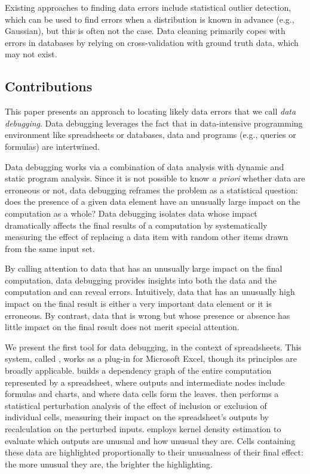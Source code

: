 
Existing approaches to finding data errors include statistical outlier
detection, which can be used to find errors when a distribution is
known in advance (e.g., Gaussian), but this is often not the
case. Data cleaning primarily copes with errors in databases by
relying on cross-validation with ground truth data, which may not
exist.

\subsection*{Contributions}

This paper presents an approach to locating likely data errors that we
call \emph{data debugging}. Data debugging leverages the fact that in
data-intensive programming environment like spreadsheets or databases,
data and programs (e.g., queries or formulas) are intertwined.

Data debugging works via a combination of data analysis with dynamic
and static program analysis.  Since it is not possible to know \emph{a
priori} whether data are erroneous or not, data debugging reframes the
problem as a statistical question: does the presence of a given data
element have an unusually large impact on the computation as a whole?
Data debugging isolates data whose impact dramatically
affects the final results of a computation by systematically measuring
the effect of replacing a data item with random other items drawn from the
same input set.

By calling attention to data that has an unusually large impact on the
final computation, data debugging provides insights into both the data
and the computation and can reveal errors. Intuitively, data that has
an unusually high impact on the final result is either a very
important data element or it is erroneous. By contrast, data that is
wrong but whose presence or absence has little impact on the final
result does not merit special attention.

We present the first tool for data debugging, in the context
of spreadsheets. This system, called \checkcell{}, works as a plug-in
for Microsoft Excel, though its principles are broadly
applicable. \checkcell{} builds a dependency graph of the entire
computation represented by a spreadsheet, where outputs and
intermediate nodes include formulas and charts, and where data cells
form the leaves. \checkcell{} then performs a statistical perturbation
analysis of the effect of inclusion or exclusion of individual cells,
measuring their impact on the spreadsheet's outputs by recalculation
on the perturbed inputs. \checkcell{} employs kernel density
estimation to evaluate which outputs are unusual and how unusual they
are.  Cells containing these data are highlighted proportionally to
their unusualness of their final effect: the more unusual they are,
the brighter the highlighting.

